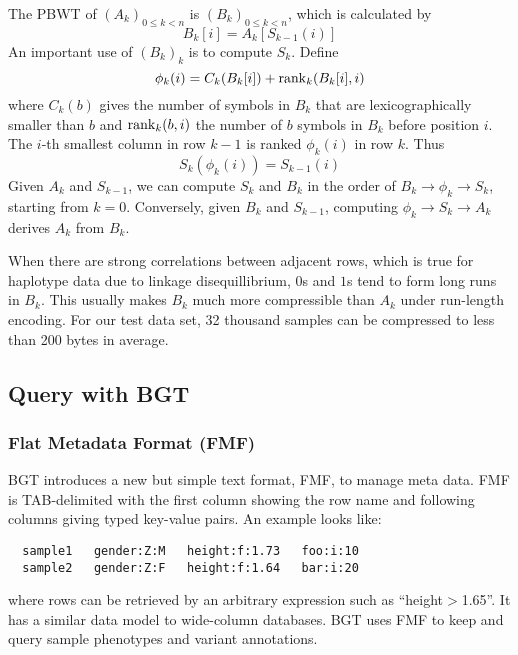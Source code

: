 \documentclass{bioinfo}
\begin{document}
\begin{methods}
The PBWT of $(A_k)_{0\le k<n}$ is $(B_k)_{0\le k<n}$, which is
calculated by
\begin{equation*}\label{eq:B}
B_k[i]=A_k[S_{k-1}(i)]
\end{equation*}
An important use of $(B_k)_k$ is to compute $S_k$. Define
\begin{equation*}\label{eq:phi}
\phi_k(i)=C_k(B_k[i])+{\rm rank}_k(B_k[i],i)
\end{equation*}
where $C_k(b)$ gives the number of symbols in $B_k$ that are lexicographically
smaller than $b$ and ${\rm rank}_k(b,i)$ the number of $b$ symbols in $B_k$
before position $i$. The $i$-th smallest column in row $k-1$ is ranked
$\phi_k(i)$ in row $k$. Thus
\begin{equation*}\label{eq:trans}
S_k(\phi_k(i))=S_{k-1}(i)
\end{equation*}
Given $A_k$ and $S_{k-1}$, we can compute $S_k$ and $B_k$ in the order of
$B_k\to\phi_k\to S_k$, starting from $k=0$. Conversely, given $B_k$ and
$S_{k-1}$, computing $\phi_k\to S_k\to A_k$ derives $A_k$ from $B_k$.

When there are strong correlations between adjacent rows, which is true for
haplotype data due to linkage disequillibrium, $0$s and $1$s tend to form long
runs in $B_k$. This usually makes $B_k$ much more compressible than $A_k$ under
run-length encoding. For our test data set, 32 thousand samples can be
compressed to less than 200 bytes in average.

\subsection{Query with BGT}

\subsubsection{Flat Metadata Format (FMF)}

BGT introduces a new but simple text format, FMF, to manage meta data. FMF is
TAB-delimited with the first column showing the row name and following columns
giving typed key-value pairs. An example looks like:
\begin{center}
\begin{verbatim}
  sample1   gender:Z:M   height:f:1.73   foo:i:10
  sample2   gender:Z:F   height:f:1.64   bar:i:20
\end{verbatim}
\end{center}
where rows can be retrieved by an arbitrary expression such as
``height$>$1.65''. It has a similar data model to wide-column databases. BGT
uses FMF to keep and query sample phenotypes and variant annotations.


\end{methods}
\end{document}
